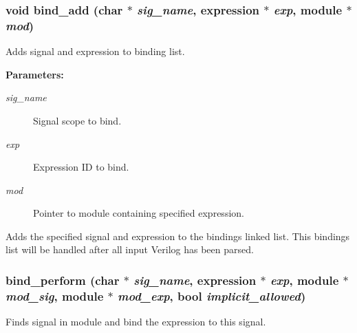 \subsubsection{\setlength{\rightskip}{0pt plus 5cm}void bind\_\-add (char $\ast$ {\em sig\_\-name}, {\bf expression} $\ast$ {\em exp}, {\bf module} $\ast$ {\em mod})}\label{binding_8c_a5}


Adds signal and expression to binding list.

\begin{Desc}
\item[{\bf Parameters: }]\par
\begin{description}
\item[
{\em sig\_\-name}]Signal scope to bind. \item[
{\em exp}]Expression ID to bind. \item[
{\em mod}]Pointer to module containing specified expression.

\end{description}
\end{Desc}
Adds the specified signal and expression to the bindings linked list. This bindings list will be handled after all input Verilog has been parsed. 
\subsubsection{ bind\_\-perform (char $\ast$ {\em sig\_\-name}, {\bf expression} $\ast$ {\em exp}, {\bf module} $\ast$ {\em mod\_\-sig}, {\bf module} $\ast$ {\em mod\_\-exp}, {\bf bool} {\em implicit\_\-allowed})}\label{binding_8c_a7}


Finds signal in module and bind the expression to this signal.

